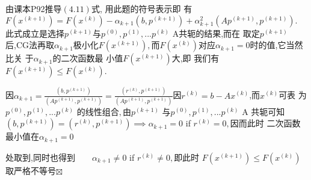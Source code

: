 \documentclass{article}
\begin{document}

由课本P92推导$\left( 4.11\right) $式,%
用此题的符号表示即%
有$F\left( x^{\left( k+1\right) }\right) =F\left( x^{\left( k\right)
}\right) -\alpha _{k+1}\left( b,p^{\left( k+1\right) }\right) +\alpha
_{k+1}^{2}\left( Ap^{\left( k+1\right) },p^{\left( k+1\right) }\right) .$%
此式成立是选择$p^{\left(
k+1\right) }$与$p^{\left( 0\right) },p^{\left( 1\right) },...p^{\left(
k\right) }$ A共轭的结果,而在%
取定$p^{\left( k+1\right) }$后,CG法再取$%
\alpha _{k+1}$极小化$F\left( x^{\left( k+1\right) }\right)
,$而$F\left( x^{\left( k\right) }\right) $对应$\alpha
_{k+1}=0$时的值,它当然比关%
于$\alpha _{k+1}$的二次函数最%
小值$F\left( x^{\left( k+1\right) }\right) $大,即%
我们有$F\left( x^{\left( k+1\right) }\right) \leq F\left(
x^{\left( k\right) }\right) .$

因$\alpha _{k+1}=\frac{\left( b,p^{\left( k+1\right) }\right) }{\left(
Ap^{\left( k+1\right) },p^{\left( k+1\right) }\right) }=\frac{\left(
r^{\left( k\right) },p^{\left( k+1\right) }\right) }{\left( Ap^{\left(
k+1\right) },p^{\left( k+1\right) }\right) }$因$r^{\left( k\right)
}=b-Ax^{\left( k\right) }$,而$x^{\left( k\right) }$可表%
为$p^{\left( 0\right) },p^{\left( 1\right) },...p^{\left( k\right) }$%
的线性组合$,$由$p^{\left( k+1\right) }$%
与$p^{\left( 0\right) },p^{\left( 1\right) },...p^{\left( k\right) }$ A%
共轭可知$\left( b,p^{\left( k+1\right) }\right)
=\left( r^{\left( k\right) },p^{\left( k+1\right) }\right) \implies \alpha
_{k+1}=0$ if $r^{\left( k\right) }=0,$因而此时%
二次函数最小值在$\alpha
_{k+1}=0$

处取到,同时也得到$\qquad
\alpha _{k+1}\neq 0$ if $r^{\left( k\right) }\neq 0,$即此时%
$F\left( x^{\left( k+1\right) }\right) \leq F\left( x^{\left( k\right)
}\right) $取严格不等号$\boxtimes $
\end{document}
